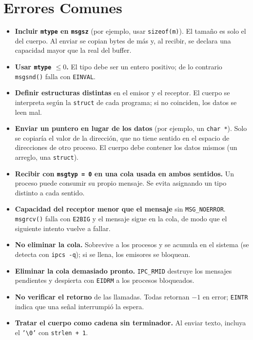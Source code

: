 \documentclass[12pt,a4paper]{article}
\begin{document}
\section{Errores Comunes}
\begin{itemize}
    \item \textbf{Incluir \texttt{mtype} en \texttt{msgsz}} (por ejemplo, usar \texttt{sizeof(m)}). El tamaño es solo el del cuerpo. Al enviar se copian bytes de más y, al recibir, se declara una capacidad mayor que la real del buffer.
    \item \textbf{Usar \texttt{mtype} $\leq 0$.} El tipo debe ser un entero positivo; de lo contrario \texttt{msgsnd()} falla con \texttt{EINVAL}.
    \item \textbf{Definir estructuras distintas} en el emisor y el receptor. El cuerpo se interpreta según la \texttt{struct} de cada programa; si no coinciden, los datos se leen mal.
    \item \textbf{Enviar un puntero en lugar de los datos} (por ejemplo, un \texttt{char *}). Solo se copiaría el valor de la dirección, que no tiene sentido en el espacio de direcciones de otro proceso. El cuerpo debe contener los datos mismos (un arreglo, una \texttt{struct}).
    \item \textbf{Recibir con \texttt{msgtyp = 0} en una cola usada en ambos sentidos.} Un proceso puede consumir su propio mensaje. Se evita asignando un tipo distinto a cada sentido.
    \item \textbf{Capacidad del receptor menor que el mensaje} sin \texttt{MSG\_NOERROR}. \texttt{msgrcv()} falla con \texttt{E2BIG} y el mensaje sigue en la cola, de modo que el siguiente intento vuelve a fallar.
    \item \textbf{No eliminar la cola.} Sobrevive a los procesos y se acumula en el sistema (se detecta con \texttt{ipcs -q}); si se llena, los emisores se bloquean.
    \item \textbf{Eliminar la cola demasiado pronto.} \texttt{IPC\_RMID} destruye los mensajes pendientes y despierta con \texttt{EIDRM} a los procesos bloqueados.
    \item \textbf{No verificar el retorno} de las llamadas. Todas retornan $-1$ en error; \texttt{EINTR} indica que una señal interrumpió la espera.
    \item \textbf{Tratar el cuerpo como cadena sin terminador.} Al enviar texto, incluya el \texttt{'\textbackslash 0'} con \texttt{strlen + 1}.
\end{itemize}
\end{document}
